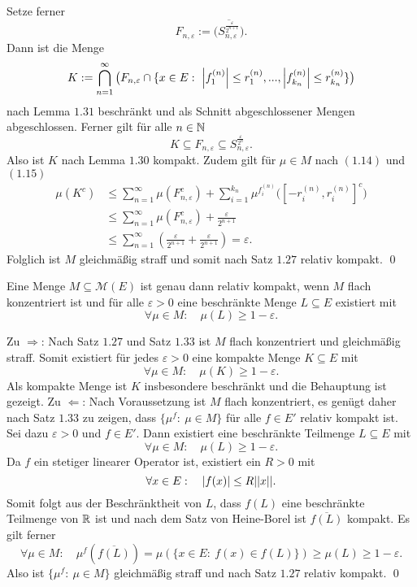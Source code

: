 \begin{proof*}
\begin{align}
    \end{align}
    Setze ferner
    $$
        F_{n,\varepsilon} := \overline{\big(S_{n,\varepsilon}^{\frac{\varepsilon}{2^{n+1}}}\big)}.
    $$
    Dann ist die Menge 
    $$
        K := \bigcap_{n =1}^{\infty}\big(F_{n, \varepsilon} \cap\{x \in E: \ \left| f_1^{(n)} \right|\leq r_1^{(n)},...,\left| f_{k_n}^{(n)} \right|\leq r_{k_n}^{(n)}\}\big)
    $$
    nach Lemma $1.31$ beschränkt und als Schnitt abgeschlossener Mengen abgeschlossen. Ferner gilt für alle $n \in \mathbb{N}$
    $$
        K \subseteq  F_{n, \varepsilon} \subseteq S_{n,\varepsilon}^{\frac{\varepsilon}{2^n}}.
    $$
    Also ist $K$ nach Lemma $1.30$ kompakt. Zudem gilt für $\mu \in M$ nach $(1.14)$ und $(1.15)$
    \begin{align*}
        \mu(K^c) &\leq \sum_{n=1}^{\infty}\mu(F_{n, \varepsilon}^c) + \sum_{i=1}^{k_n}\mu^{f_i^{(n)}}\big([-r_i^{(n)}, r_i^{(n)}]^c\big) \\\
                 &\leq \sum_{n=1}^{\infty}\mu(F_{n, \varepsilon}^c) + \frac{\varepsilon}{2^{n+1}} \\\
                 &\leq \sum_{n=1}^{\infty}(\frac{\varepsilon}{2^{n+1}} + \frac{\varepsilon}{2^{n+1}}) = \varepsilon. 
    \end{align*}
    Folglich ist $M$ gleichmäßig straff und somit nach Satz $1.27$ relativ kompakt. \qed
\end{proof*}

\begin{corollary}
    Eine Menge $M \subseteq \mathcal{M}(E)$ ist genau dann relativ kompakt, wenn $M$ flach konzentriert ist und für alle $\varepsilon > 0$ eine beschränkte Menge $L \subseteq E$ existiert mit
    $$
        \forall \mu \in M: \quad \mu(L) \geq 1 - \varepsilon. 
    $$
\end{corollary}

\begin{proof*}
    Zu $\Rightarrow$: Nach Satz $1.27$ und Satz $1.33$ ist $M$ flach konzentriert und gleichmäßig straff. Somit existiert für jedes $\varepsilon > 0$ eine kompakte Menge $K \subseteq E$ mit 
    $$
        \forall \mu \in M: \quad \mu(K) \geq 1 - \varepsilon. 
    $$
    Als kompakte Menge ist $K$ insbesondere beschränkt und die Behauptung ist gezeigt.
    \newline  
    Zu $\Leftarrow$: Nach Voraussetzung ist $M$ flach konzentriert, es genügt daher nach Satz $1.33$ zu zeigen, dass $\{\mu^f : \ \mu \in M\}$ für alle $f \in E'$ relativ kompakt ist. Sei dazu $\varepsilon > 0$ und $f \in E'$. 
    Dann existiert eine beschränkte Teilmenge $L \subseteq E$ mit
    $$
        \forall \mu \in M: \quad \mu(L) \geq 1 - \varepsilon.
    $$
    Da $f$ ein stetiger linearer Operator ist, existiert ein $R > 0$ mit 
    $$
        \forall x \in E: \quad \left| f(x) \right| \leq R \lvert\lvert x \rvert\rvert. 
    $$
    Somit folgt aus der Beschränktheit von $L$, dass $f(L)$ eine beschränkte Teilmenge von $\mathbb{R}$ ist und nach dem Satz von Heine-Borel ist $\overline{f(L)}$ kompakt. Es gilt ferner
    $$
        \forall \mu \in M: \quad \mu^f(\overline{f(L)}) = \mu(\{x \in E: \ f(x) \in f(L)\}) \geq \mu(L) \geq 1 - \varepsilon. 
    $$
    Also ist $\{\mu^f : \ \mu \in M\}$ gleichmäßig straff und nach Satz $1.27$ relativ kompakt. \qed
\end{proof*}

